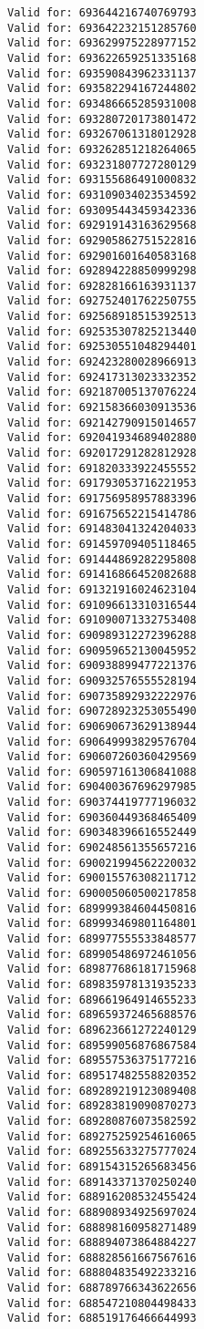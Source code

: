 \documentclass[11pt]{article}
\begin{document}
\begin{Verbatim}[commandchars=\\\{\}]
Valid for: 693644216740769793
Valid for: 693642232151285760
Valid for: 693629975228977152
Valid for: 693622659251335168
Valid for: 693590843962331137
Valid for: 693582294167244802
Valid for: 693486665285931008
Valid for: 693280720173801472
Valid for: 693267061318012928
Valid for: 693262851218264065
Valid for: 693231807727280129
Valid for: 693155686491000832
Valid for: 693109034023534592
Valid for: 693095443459342336
Valid for: 692919143163629568
Valid for: 692905862751522816
Valid for: 692901601640583168
Valid for: 692894228850999298
Valid for: 692828166163931137
Valid for: 692752401762250755
Valid for: 692568918515392513
Valid for: 692535307825213440
Valid for: 692530551048294401
Valid for: 692423280028966913
Valid for: 692417313023332352
Valid for: 692187005137076224
Valid for: 692158366030913536
Valid for: 692142790915014657
Valid for: 692041934689402880
Valid for: 692017291282812928
Valid for: 691820333922455552
Valid for: 691793053716221953
Valid for: 691756958957883396
Valid for: 691675652215414786
Valid for: 691483041324204033
Valid for: 691459709405118465
Valid for: 691444869282295808
Valid for: 691416866452082688
Valid for: 691321916024623104
Valid for: 691096613310316544
Valid for: 691090071332753408
Valid for: 690989312272396288
Valid for: 690959652130045952
Valid for: 690938899477221376
Valid for: 690932576555528194
Valid for: 690735892932222976
Valid for: 690728923253055490
Valid for: 690690673629138944
Valid for: 690649993829576704
Valid for: 690607260360429569
Valid for: 690597161306841088
Valid for: 690400367696297985
Valid for: 690374419777196032
Valid for: 690360449368465409
Valid for: 690348396616552449
Valid for: 690248561355657216
Valid for: 690021994562220032
Valid for: 690015576308211712
Valid for: 690005060500217858
Valid for: 689999384604450816
Valid for: 689993469801164801
Valid for: 689977555533848577
Valid for: 689905486972461056
Valid for: 689877686181715968
Valid for: 689835978131935233
Valid for: 689661964914655233
Valid for: 689659372465688576
Valid for: 689623661272240129
Valid for: 689599056876867584
Valid for: 689557536375177216
Valid for: 689517482558820352
Valid for: 689289219123089408
Valid for: 689283819090870273
Valid for: 689280876073582592
Valid for: 689275259254616065
Valid for: 689255633275777024
Valid for: 689154315265683456
Valid for: 689143371370250240
Valid for: 688916208532455424
Valid for: 688908934925697024
Valid for: 688898160958271489
Valid for: 688894073864884227
Valid for: 688828561667567616
Valid for: 688804835492233216
Valid for: 688789766343622656
Valid for: 688547210804498433
Valid for: 688519176466644993

\end{Verbatim}
\end{document}
